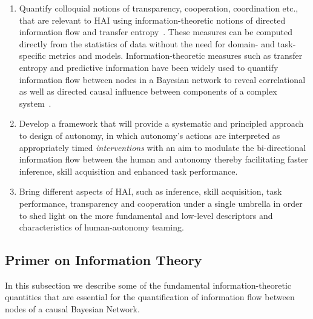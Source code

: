 \documentclass[12pt]{article}
\begin{document}
\begin{enumerate}
	\item Quantify colloquial notions of transparency, cooperation, coordination etc., that are relevant to HAI using information-theoretic notions of directed information flow and transfer entropy~\cite{schreiber2000measuring}. These measures can be computed directly from the statistics of data without the need for domain- and task-specific metrics and models. Information-theoretic measures such as transfer entropy and predictive information have been widely used to quantify information flow between nodes in a Bayesian network to reveal correlational as well as directed causal influence between components of a complex system~\cite{ay2008information}. 
	
	\item Develop a framework that will provide a systematic and principled approach to design of autonomy, in which autonomy's actions are interpreted as appropriately timed \textit{interventions} with an aim to modulate the bi-directional information flow between the human and autonomy thereby facilitating faster inference, skill acquisition and enhanced task performance.
	
	\item Bring different aspects of HAI, such as inference, skill acquisition, task performance, transparency and cooperation under a single umbrella in order to shed light on the more fundamental and low-level descriptors and characteristics of human-autonomy teaming. 
\end{enumerate}

%
%
%
\subsection{Primer on Information Theory}
In this subsection we describe some of the fundamental information-theoretic quantities that are essential for the quantification of information flow between nodes of a causal Bayesian Network. 
\end{document}
